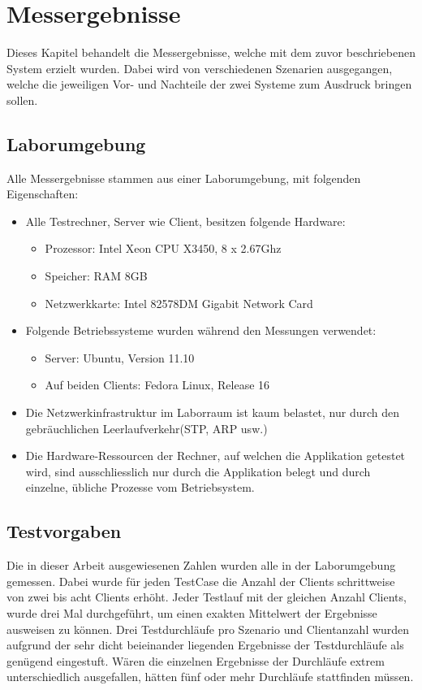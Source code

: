 \chapter{Messergebnisse}

Dieses Kapitel be\-han\-delt die Mess\-er\-geb\-nis\-se, welche mit dem zu\-vor be\-schrie\-be\-nen System erzielt wurden. Dabei wird von verschiedenen Sze\-narien aus\-ge\-gang\-en, welche die jeweiligen Vor- und Nach\-teile der zwei Sy\-stem\-e zum Ausdruck bringen sollen. 

\section{Laborumgebung}

Alle Mes\-ser\-ge\-bnis\-se stam\-men aus einer Labor\-umgebung, mit folgenden Ei\-gen\-schaf\-ten:

\begin{itemize}
\item Alle Testrechner, Server wie Client, besitzen folgende Hardware:
\begin{itemize}
\item Prozessor: Intel Xeon CPU X3450, 8 x 2.67Ghz
\item Speicher: RAM 8GB
\item Netzwerkkarte: Intel 82578DM Gigabit Network Card
\end{itemize}
\item Folgende Betriebssysteme wurden während den Messungen verwendet:
\begin{itemize}
\item Server: Ubuntu, Version 11.10
\item Auf beiden Clients: Fedora Linux, Release 16
\end{itemize}
\item Die Netzwerkinfrastruktur im Laborraum ist kaum belastet, nur durch den gebräuchlichen Leerlaufverkehr(\gls{STP}, \gls{ARP} usw.)
\item Die Hardware-Ressourcen der Rechner, auf welchen die Applikation getestet wird, sind ausschliesslich nur durch die Applikation belegt und durch einzelne, übliche Prozesse vom  Betriebsystem.
\end{itemize}

\section{Testvorgaben}
Die in dieser Arbeit ausgewiesenen Zahlen wurden alle in der La\-bor\-um\-gebung ge\-mes\-sen. Dabei wurde für jeden Test\-Case die An\-zahl der Clients schritt\-weise von zwei bis acht Clients erhöht. Jeder Test\-lauf mit der gleichen Anzahl Clients, wurde drei Mal durchgeführt, um einen exakten Mittel\-wert der Er\-geb\-nis\-se aus\-weisen zu können. Drei Test\-durchläufe pro Szenario und Clientanzahl wurden aufgrund der sehr dicht beieinander liegenden Er\-geb\-nis\-se der Testdurchläufe als genügend eingestuft. Wären die einzelnen Ergebnisse der Durchläufe extrem unterschiedlich ausgefallen, hätten fünf oder mehr Durchläufe stattfinden müssen.

